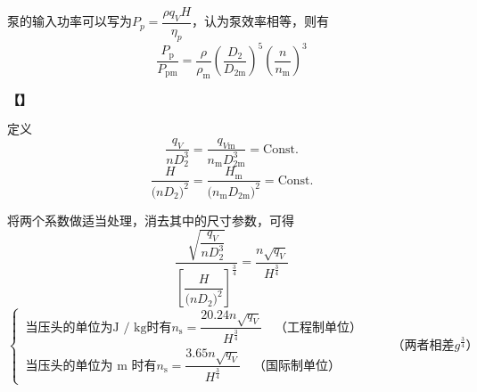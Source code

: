 \noindent \textbf{\blue[【功率关系】]} 
泵的输入功率可以写为$P_p = \dfrac{\rho q_V H}{\eta_p}$，认为泵效率相等，则有
\begin{equation}
	\dfrac{P_{\text{p}}}{P_{\text{pm}}} = \dfrac{\rho}{\rho_{\text{m}}} \left(\dfrac{D_2}{D_{2\text{m}}}\right)^5\left(\dfrac{n}{n_{\text{m}}}\right)^3
\end{equation}

\vspace*{0.5em}

\noindent \textbf{【\blue[（综合性能参数）]】}

定义
\begin{equation}
	\dfrac{q_{V}}{n D_2^3} = \dfrac{q_{V\text{m}}}{n_{\text{m}}D_{2\text{m}}^3} = \text{Const.}
	\label{流量系数}
\end{equation}
\begin{equation}
	\dfrac{H}{\big(n D_2\big)^2} = \dfrac{H_{\text{m}}}{\big(n_{\text{m}} D_{2\text{m}}\big)^2} = \text{Const.}
\end{equation}
\vspace*{0.5em}

将两个系数做适当处理，消去其中的尺寸参数，可得
\begin{equation}
	\dfrac{\sqrt{\dfrac{q_V}{nD_2^3}}}{\left[\dfrac{H}{\big(n D_2\big)^2}\right]^{\textstyle \frac{3}{4}}} = \dfrac{n\sqrt{q_V}}{H^{\textstyle \frac{3}{4}}}
\end{equation}
\begin{equation*}
	\begin{cases}
		\, \mbox{当压头的单位为}\text{J / kg}\mbox{时有}n_\text{s} = \dfrac{20.24 n\sqrt{q_V}}{H^{\textstyle \frac{3}{4}}}\quad \mbox{（工程制单位）}\\[1.5em]
		\, \mbox{当压头的单位为 m 时有}n_\text{s} = \dfrac{3.65 n\sqrt{q_V}}{H^{\textstyle \frac{3}{4}}} \quad \mbox{（国际制单位）}
	\end{cases}
	\qquad \mbox{（两者相差} g^{\frac{3}{4}}\mbox{）}
\end{equation*}
\clearpage

\vspace*{-3em}
\warn
[
	(1) \hspace*{0.3em}对于多级泵，$H$按单级计算；对于双面进口叶轮，按单面入口流量计算；\\
	(2) \hspace*{0.3em}$n_s$是对应于最高效率点的工况值，如$i$级泵第一级为双面进口叶轮，则
	$n_s = \dfrac{3.65n\sqrt{q_v/2}}{\big(H/i\big)^{\textstyle \frac{3}{4}}}$\\
	(3) \hspace*{0.3em}几何相似、工况相似，则比转速相等；比转速相等泵不一定相似\\
	(4) \hspace*{0.3em}比转速是一个确定泵类型并影响泵级数选择的基本准测数。可以按$n_{\text{s}}$对泵及其特性曲线的趋势进行分类，即比转速是有因次的。
]
\vspace*{1em}

